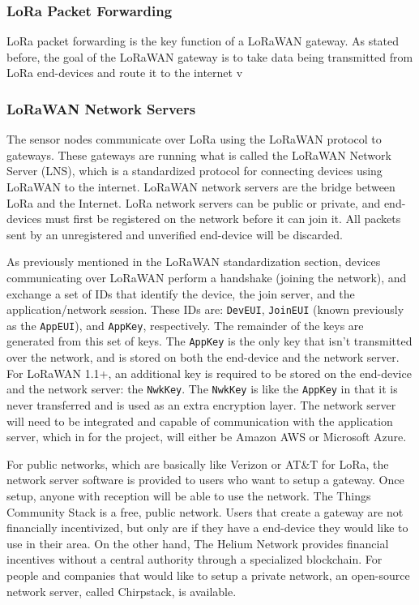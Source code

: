 \subsubsection{LoRa Packet Forwarding}
LoRa packet forwarding is the key function of a LoRaWAN gateway. As stated before, the goal of  the LoRaWAN gateway is to take data being transmitted from LoRa end-devices and route it to the internet v

\subsubsection{LoRaWAN Network Servers} The sensor nodes communicate over LoRa
using the LoRaWAN protocol to gateways.  These gateways are running what is
called the LoRaWAN Network Server (LNS), which is a standardized protocol for
connecting devices using LoRaWAN to the internet.  LoRaWAN network servers are
the bridge between LoRa and the Internet.  LoRa network servers can be public or
private, and end-devices must first be registered on the network before it can
join it. All packets sent by an unregistered and unverified end-device will be
discarded.

As previously mentioned in the LoRaWAN standardization section,
devices communicating over LoRaWAN perform a handshake (joining the network),
and exchange a set of IDs that identify the device, the join server, and the
application/network session. These IDs are: \texttt{DevEUI}, \texttt{JoinEUI} (known previously as
the \texttt{AppEUI}), and \texttt{AppKey}, respectively. The remainder of the keys are generated
from this set of keys. The \texttt{AppKey} is the only key that isn't transmitted over
the network, and is stored on both the end-device and the network server. For
LoRaWAN 1.1+, an additional key is required to be stored on the end-device and
the network server: the \texttt{NwkKey}. The \texttt{NwkKey} is like the \texttt{AppKey} in that it is
never transferred and is used as an extra encryption layer. The network server
will need to be integrated and capable of communication with the application
server, which in for the project, will either be Amazon AWS or Microsoft Azure.

For public networks, which are basically like Verizon or AT\&T for LoRa, the
network server software is provided to users who want to setup a gateway. Once
setup, anyone with reception will be able to use the network. The Things Community Stack
is a free, public network. Users that create a gateway are not financially
incentivized, but only are if they have a end-device they would like to use in
their area. On the other hand, The Helium Network provides financial incentives
without a central authority through a specialized blockchain. For people and
companies that would like to setup a private network, an open-source network
server, called Chirpstack, is available.


